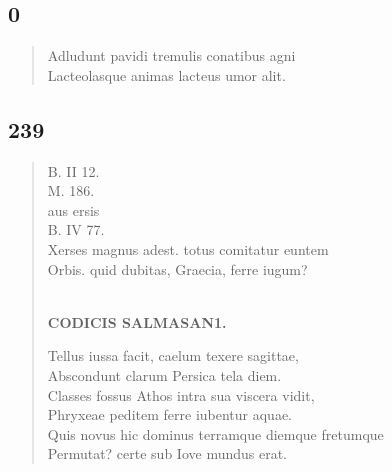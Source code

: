 \documentclass[11pt, a4paper]{report}
\begin{document}
            \subsection*{0}
      \begin{verse}
      Adludunt pavidi tremulis conatibus agni \\ Lacteolasque animas lacteus umor alit. \\ 
      \end{verse}
  
            \subsection*{239}
      \begin{verse}
      B. II 12. \\ M. 186. \\ aus ersis \\ B. IV 77. \\ Xerses magnus adest. totus comitatur euntem \\ Orbis. quid dubitas, Graecia, ferre iugum? \\ 
        ﻿\pagebreak 
    \begin{center} \textbf{CODICIS SALMASAN1.} \end{center} \marginpar{[197]} Tellus iussa facit, caelum texere sagittae, \\ Abscondunt clarum Persica tela diem. \\ Classes fossus Athos intra sua viscera vidit, \\ Phryxeae peditem ferre iubentur aquae. \\ Quis novus hic dominus terramque diemque fretumque \\ Permutat? certe sub Iove mundus erat. \\ 
      \end{verse}
  
\end{document}
